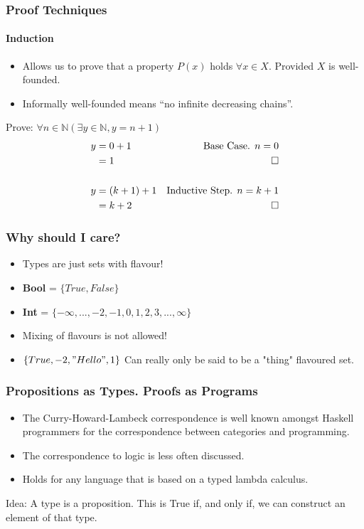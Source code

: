 \documentclass{beamer}
\begin{document}
\begin{frame}
  \frametitle{Proof Techniques}
  \framesubtitle{Induction}
  \begin{itemize}
    \item Allows us to prove that a property $P(x)$ holds $\forall x \in X$.
          Provided $X$ is well-founded.
    \item Informally well-founded means ``no infinite decreasing chains''.
  \end{itemize}
   Prove: $\forall n \in \mathbb{N}(\exists y \in \mathbb{N}, y = n + 1)$ \\
   \begin{align*}
   y &= 0 + 1 &\text{Base Case. $n = 0$} \\
     &= 1 &\qed \\
   \\
   y &= (k + 1) + 1 &\text{Inductive Step. $n = k + 1$} \\
     &= k + 2 &\qed
   \end{align*}
\end{frame}


\begin{frame}
  \frametitle{Why should I care?}
  \begin{itemize}
    \item Types are just sets with flavour!
    \item \textbf{Bool} = $\{True, False\}$
    \item \textbf{Int} = $\{-\infty, ..., -2, -1, 0, 1, 2, 3, ..., \infty\}$
    \item Mixing of flavours is not allowed!
    \item $\{True, -2, "Hello", 1\}$ Can really only be said to be a "thing"
          flavoured set.
  \end{itemize}
\end{frame}

\begin{frame}
  \frametitle{Propositions as Types. Proofs as Programs}
  \begin{itemize}
    \item The Curry-Howard-Lambeck correspondence is well known amongst
          Haskell programmers for the correspondence between categories and
          programming.
    \item The correspondence to logic is less often discussed.
    \item Holds for any language that is based on a typed lambda calculus.
  \end{itemize}
  Idea: A type is a proposition. This is True if, and only if, we can construct
        an element of that type.
\end{frame}
\end{document}

